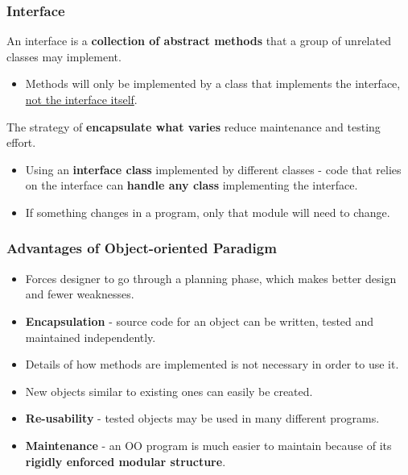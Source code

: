 \subsubsection*{Interface}

An interface is a \textbf{collection of abstract methods} that a group of unrelated classes may implement.
\begin{itemize}
    \item Methods will only be implemented by a class that implements the interface, \underline{not the interface itself}.
\end{itemize}

The strategy of \textbf{encapsulate what varies} reduce maintenance and testing effort.
\begin{itemize}
    \item Using an \textbf{interface class} implemented by different classes - code that relies on the interface can \textbf{handle any class} implementing the interface.
    \item If something changes in a program, only that module will need to change.
\end{itemize}

\subsubsection*{Advantages of Object-oriented Paradigm}
\begin{itemize}
    \item Forces designer to go through a planning phase, which makes better design and fewer weaknesses.
    \item \textbf{Encapsulation} - source code for an object can be written, tested and maintained independently.
    \item Details of how methods are implemented is not necessary in order to use it.
    \item New objects similar to existing ones can easily be created.
    \item \textbf{Re-usability} - tested objects may be used in many different programs.
    \item \textbf{Maintenance} - an OO program is much easier to maintain because of its \textbf{rigidly enforced modular structure}.
\end{itemize}
